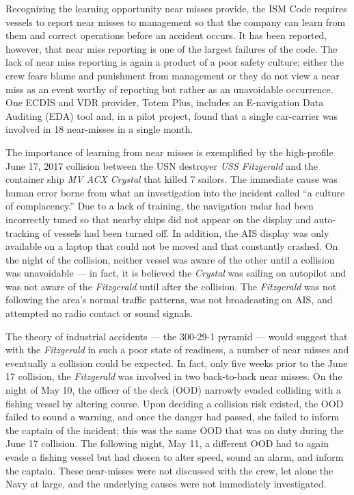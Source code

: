 \documentclass[twoside,symmetric,notoc]{tufte-book}
\begin{document}
\par{%
Recognizing the learning opportunity near misses provide, the ISM Code requires vessels to report near misses to management so that the company can learn from them and correct operations before an accident occurs. It has been reported, however, that near miss reporting is one of the largest failures of the code.\cite{Lappalainen} The lack of near miss reporting is again a product of a poor safety culture; either the crew fears blame and punishment from management or they do not view a near miss as an event worthy of reporting but rather as an unavoidable occurrence.\cite{Cambria} One ECDIS and VDR provider, Totem Plus, includes an E-navigation Data Auditing (EDA) tool and, in a pilot project, found that a single car-carrier was involved in 18 near-misses in a single month.\cite{Riveria}
}
\par{%
The importance of learning from near misses is exemplified by the high-profile June 17, 2017 collision between the USN destroyer \textit{USS Fitzgerald} and the container ship \textit{MV ACX Crystal} that killed 7 sailors.\cite{Faturechi} The immediate cause was human error borne from what an investigation into the incident called ``a culture of complacency.'' Due to a lack of training, the navigation radar had been incorrectly tuned so that nearby ships did not appear on the display and auto-tracking of vessels had been turned off. In addition, the AIS display was only available on a laptop that could not be moved and that constantly crashed.\cite{Ziezulewicz} On the night of the collision, neither vessel was aware of the other until a collision was unavoidable --- in fact, it is believed the \textit{Crystal} was sailing on autopilot and was not aware of the \textit{Fitzgerald} until after the collision.\cite{Martime_Executive} The \textit{Fitzgerald} was not following the area's normal traffic patterns, was not broadcasting on AIS, and attempted no radio contact or sound signals.
}
\par{%
The theory of industrial accidents --- the 300-29-1 pyramid --- would suggest that with the \textit{Fitzgerald} in such a poor state of readiness, a number of near misses and eventually a collision could be expected. In fact, only five weeks prior to the June 17 collision, the \textit{Fitzgerald} was involved in two back-to-back near misses. On the night of May 10, the officer of the deck (OOD) narrowly evaded colliding with a fishing vessel by altering course. Upon deciding a collision risk existed, the OOD failed to sound a warning, and once the danger had passed, she failed to inform the captain of the incident; this was the same OOD that was on duty during the June 17 collision. The following night, May 11, a different OOD had to again evade a fishing vessel but had chosen to alter speed, sound an alarm, and inform the captain. These near-misses were not discussed with the crew, let alone the Navy at large, and the underlying causes were not immediately investigated.\cite{Miller}
}
\end{document}
